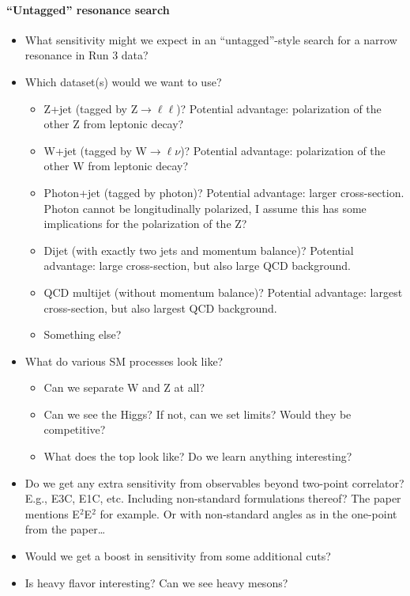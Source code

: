 \documentclass[11pt]{article}
\begin{document}
\paragraph{``Untagged'' resonance search}
\begin{itemize}
    \item What sensitivity might we expect in an ``untagged''-style search for a narrow resonance in Run 3 data? 
    \item Which dataset(s) would we want to use? 
    \begin{itemize}
        \item Z+jet (tagged by Z$\to \ell\ell$)? Potential advantage: polarization of the other Z from leptonic decay?
        \item W+jet (tagged by W$\to \ell\nu$)? Potential advantage: polarization of the other W from leptonic decay?
        \item Photon+jet (tagged by photon)? Potential advantage: larger cross-section. Photon cannot be longitudinally polarized, I assume this has some implications for the polarization of the Z? 
        \item Dijet (with exactly two jets and momentum balance)? Potential advantage: large cross-section, but also large QCD background.
        \item QCD multijet (without momentum balance)? Potential advantage: largest cross-section, but also largest QCD background.
        \item Something else?
    \end{itemize}
    \item What do various SM processes look like?
    \begin{itemize}
        \item Can we separate W and Z at all?
        \item Can we see the Higgs? If not, can we set limits? Would they be competitive?
        \item What does the top look like? Do we learn anything interesting? 
    \end{itemize}
    \item Do we get any extra sensitivity from observables beyond two-point correlator? E.g., E3C, E1C, etc. Including non-standard formulations thereof? The paper mentions E$^2$E$^2$ for example. Or with non-standard angles as in the one-point from the paper\ldots
    \item Would we get a boost in sensitivity from some additional cuts? 
    \item Is heavy flavor interesting? Can we see heavy mesons? 

\end{itemize}
\end{document}
